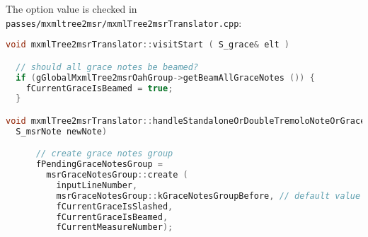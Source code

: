 The option value is checked in {\tt passes/mxmltree2msr/mxmlTree2msrTranslator.cpp}:
\begin{lstlisting}[language=C++]
void mxmlTree2msrTranslator::visitStart ( S_grace& elt )

  // should all grace notes be beamed?
  if (gGlobalMxmlTree2msrOahGroup->getBeamAllGraceNotes ()) {
    fCurrentGraceIsBeamed = true;
  }

void mxmlTree2msrTranslator::handleStandaloneOrDoubleTremoloNoteOrGraceNoteOrRest (
  S_msrNote newNote)

      // create grace notes group
      fPendingGraceNotesGroup =
        msrGraceNotesGroup::create (
          inputLineNumber,
          msrGraceNotesGroup::kGraceNotesGroupBefore, // default value
          fCurrentGraceIsSlashed,
          fCurrentGraceIsBeamed,
          fCurrentMeasureNumber);

\end{lstlisting}
